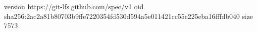 version https://git-lfs.github.com/spec/v1
oid sha256:2ac2a81b80703b9ffe7220354fd530d594a5e011421cc55c225eba16fffdb040
size 7573
